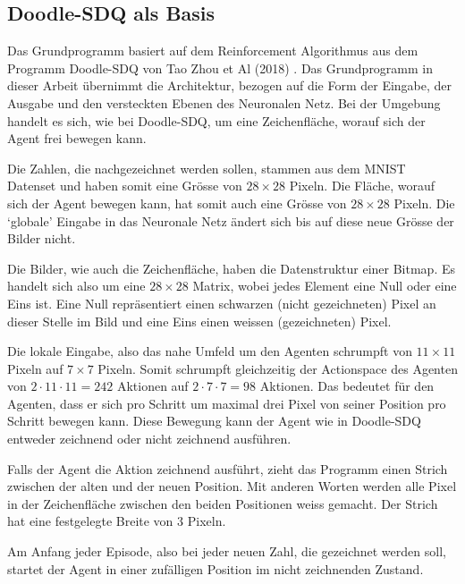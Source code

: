 \subsection*{Doodle-SDQ als Basis}
Das Grundprogramm basiert auf dem Reinforcement Algorithmus aus dem Programm
Doodle-SDQ von Tao Zhou et Al (2018) \cite{zhou_learning_2018}. Das
Grundprogramm in dieser Arbeit übernimmt die Architektur, bezogen auf die Form
der Eingabe, der Ausgabe und den versteckten Ebenen des Neuronalen Netz.
Bei der Umgebung handelt es sich, wie bei Doodle-SDQ, um eine Zeichenfläche,
worauf sich der Agent frei bewegen kann.

Die Zahlen, die nachgezeichnet werden sollen, stammen aus dem MNIST Datenset und
haben somit eine Grösse von $28\times28$ Pixeln. Die Fläche, worauf sich der Agent
bewegen kann, hat somit auch eine Grösse von $28\times28$ Pixeln. Die `globale' Eingabe
in das Neuronale Netz ändert sich bis auf diese neue Grösse der Bilder nicht.

Die Bilder, wie auch die Zeichenfläche, haben die Datenstruktur einer Bitmap. Es
handelt sich also um eine $28\times28$ Matrix, wobei jedes Element eine Null oder eine
Eins ist. Eine Null repräsentiert einen schwarzen (nicht gezeichneten) Pixel an
dieser Stelle im Bild und eine Eins einen weissen (gezeichneten) Pixel.


Die lokale Eingabe, also das nahe Umfeld um den Agenten schrumpft von
$11\times11$ Pixeln auf $7\times7$ Pixeln. Somit schrumpft gleichzeitig der
Actionspace des Agenten von $2\cdot11\cdot11 = 242$ Aktionen auf $2\cdot7\cdot7
= 98$ Aktionen. Das bedeutet für den Agenten, dass er sich pro Schritt um
maximal drei Pixel von seiner Position pro Schritt bewegen kann. Diese Bewegung
kann der Agent wie in Doodle-SDQ entweder zeichnend oder nicht zeichnend
ausführen.

Falls der Agent die Aktion zeichnend ausführt, zieht das Programm einen Strich
zwischen der alten und der neuen Position. Mit anderen Worten werden alle Pixel
in der Zeichenfläche zwischen den beiden Positionen weiss gemacht. Der Strich
hat eine festgelegte Breite von $3$ Pixeln.

Am Anfang jeder Episode, also bei jeder neuen Zahl, die gezeichnet werden soll,
startet der Agent in einer zufälligen Position im nicht zeichnenden Zustand.

